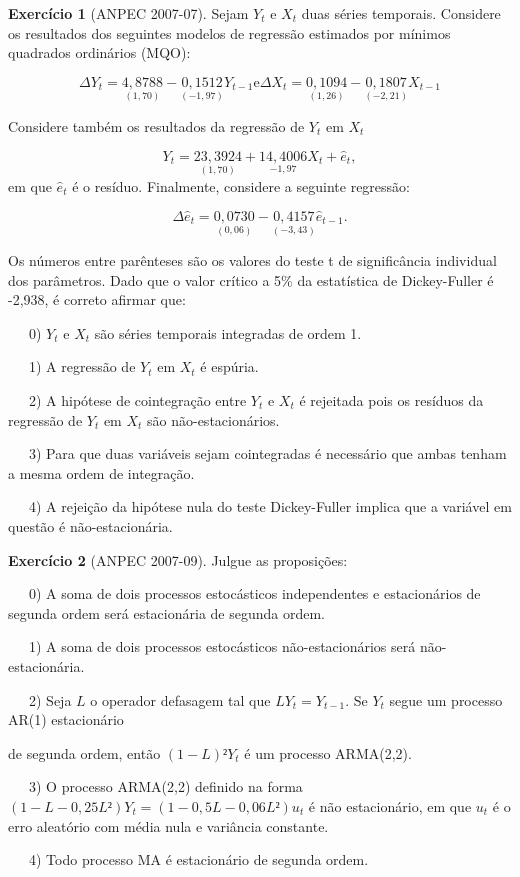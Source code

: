 \documentclass[
]{book}
\theoremstyle{definition}
\theoremstyle{definition}
\theoremstyle{definition}
\newtheorem{exercise}{Exercício}[chapter]
\theoremstyle{remark}
\begin{document}
\begin{exercise}[ANPEC 2007-07]
\protect\hypertarget{exr:exns2}{}{\label{exr:exns2} {} } Sejam \(Y_t\) e \(X_t\) duas séries temporais. Considere os resultados dos seguintes modelos de regressão estimados por mínimos quadrados ordinários (MQO):

\[\Delta Y_t = \underset{(1,70)}{4,8788} - \underset{(-1,97)}{0,1512} Y_{t-1} \mbox{e}
 \Delta X_t = \underset{(1,26)}{0,1094} -\underset{(-2,21)}{0,1807}X_{t-1} \]

Considere também os resultados da regressão de \(Y_t\) em \(X_t\)

\[Y_t = \underset{(1,70)}{23,3924} + \underset{-1,97}{14,4006} X_t + \widehat{e}_t,\]
em que \(\widehat{e}_t\) é o resíduo. Finalmente, considere a seguinte regressão:

\[\Delta \widehat{e}_t = \underset{(0,06)}{0,0730} - \underset{(-3,43)}{0,4157} \widehat{e}_{t-1}.\]

Os números entre parênteses são os valores do teste t de significância individual dos parâmetros. Dado que o valor crítico a 5\% da estatística de Dickey-Fuller é -2,938, é correto afirmar que:

~~~0) \(Y_t\) e \(X_t\) são séries temporais integradas de ordem 1.

~~~1) A regressão de \(Y_t\) em \(X_t\) é espúria.

~~~2) A hipótese de cointegração entre \(Y_t\) e \(X_t\) é rejeitada pois os resíduos da regressão de \(Y_t\) em \(X_t\) são não-estacionários.

~~~3) Para que duas variáveis sejam cointegradas é necessário que ambas tenham a mesma ordem de integração.

~~~4) A rejeição da hipótese nula do teste Dickey-Fuller implica que a variável em questão é não-estacionária.
\end{exercise}

\begin{exercise}[ANPEC 2007-09]
\protect\hypertarget{exr:exns3}{}{\label{exr:exns3} {} }
Julgue as proposições:

~~~0) A soma de dois processos estocásticos independentes e estacionários de segunda ordem será estacionária de segunda ordem.

~~~1) A soma de dois processos estocásticos não-estacionários será não-estacionária.

~~~2) Seja \(L\) o operador defasagem tal que \(LY_t = Y_{t-1}\). Se \(Y_t\) segue um processo AR(1) estacionário

de segunda ordem, então \((1-L)²Y_t\) é um processo ARMA(2,2).

~~~3) O processo ARMA(2,2) definido na forma \((1-L-0,25L²)Y_t=(1-0,5L-0,06L²)u_t\) é não estacionário, em que \(u_t\) é o erro aleatório com média nula e variância constante.

~~~4) Todo processo MA é estacionário de segunda ordem.
\end{exercise}
\end{document}
